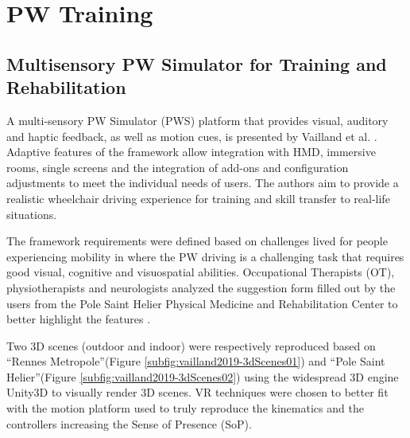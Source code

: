 \section{PW Training}
\label{sec:pwTraining}
\subsection{Multisensory PW Simulator for Training and Rehabilitation}
A multi-sensory PW Simulator (PWS)  platform that provides visual, auditory and haptic feedback, as well as motion cues, is presented by Vailland et al. \cite{vailland2019}. Adaptive features of the framework allow integration with HMD, immersive rooms, single screens and the integration of add-ons and configuration adjustments to meet the individual needs of users. The authors aim to provide a realistic wheelchair driving experience for training and skill transfer to real-life situations.

The framework requirements were defined based on challenges lived for people experiencing mobility in where the PW driving is a challenging task that requires good visual, cognitive and visuospatial abilities. Occupational Therapists (OT), physiotherapists and neurologists analyzed the suggestion form filled out by the users from the Pole Saint Helier Physical Medicine and Rehabilitation Center to better highlight the features \cite{vailland2019}.

Two  3D scenes (outdoor and indoor) were respectively reproduced based on ``Rennes Metropole''(Figure \ref{subfig:vailland2019-3dScenes01}) and ``Pole Saint Helier''(Figure \ref{subfig:vailland2019-3dScenes02}) using the widespread 3D engine Unity3D to visually render 3D scenes. VR techniques were chosen to better fit with the motion platform used to truly reproduce the kinematics and the controllers increasing the Sense of Presence (SoP). 

